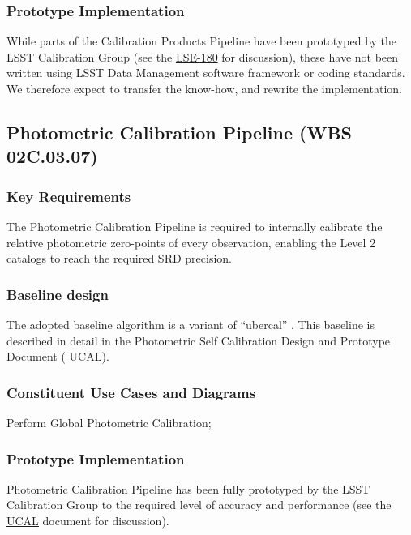 \documentclass[12pt]{article}
\newcommand{\ds}[2]{{\color{blue} \href{https://docushare.lsstcorp.org/docushare/dsweb/Get/#1}{#2}}\xspace}
\newcommand{\NewPCP}{\ds{LSE-180}{LSE-180}}
\newcommand{\UCAL}{\ds{Document-15125}{UCAL}}
\newcommand{\wbsPhotoCal}{WBS 02C.03.07}
\begin{document}
\subsubsection{Prototype Implementation}

While parts of the Calibration Products Pipeline have been prototyped by the LSST Calibration Group (see the \NewPCP for discussion), these have not been written using LSST Data Management software framework or coding standards. We therefore expect to transfer the know-how, and rewrite the implementation.

\clearpage

\subsection{Photometric Calibration Pipeline (\wbsPhotoCal)}

\subsubsection{Key Requirements}

The Photometric Calibration Pipeline is required to internally calibrate the relative photometric zero-points of every observation, enabling the Level 2 catalogs to reach the required SRD precision.

\subsubsection{Baseline design}

The adopted baseline algorithm is a variant of ``ubercal'' \cite{Padmanabhan08, Schlafly12}. This baseline is described in detail in the Photometric Self Calibration Design and Prototype Document (\UCAL).

\subsubsection{Constituent Use Cases and Diagrams}

Perform Global Photometric Calibration;

\subsubsection{Prototype Implementation}

Photometric Calibration Pipeline has been fully prototyped by the LSST Calibration Group to the required level of accuracy and performance (see the \UCAL document for discussion). %
\\
\end{document}
